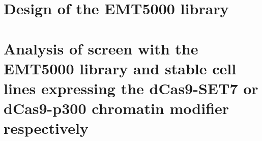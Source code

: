 \documentclass[12pt]{report}
\begin{document}
\chapter{Design of the EMT5000 library}
\label{ch:EMT5000_library}


\chapter{Analysis of screen with the EMT5000 library and stable cell lines expressing the dCas9-SET7 or dCas9-p300 chromatin modifier respectively}
\label{ch:EMT5000-screen}





\end{document}
